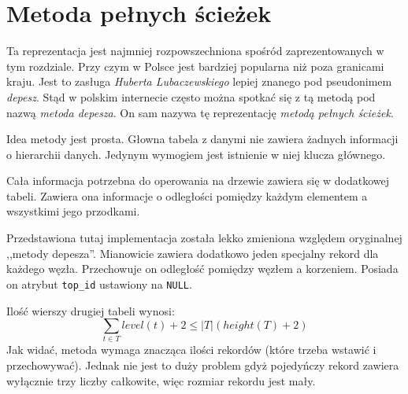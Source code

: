 \section{Metoda pełnych ścieżek}
% 




Ta reprezentacja jest najmniej rozpowszechniona spośród zaprezentowanych w tym rozdziale.
Przy czym w Polsce jest bardziej popularna niż poza granicami kraju.
Jest to zasługa \emph{Huberta Lubaczewskiego} lepiej znanego pod pseudonimem \emph{depesz}.
Stąd w polskim internecie często można spotkać się z tą metodą pod nazwą \emph{metoda depesza}.
On sam nazywa tę reprezentację \emph{metodą pełnych ścieżek}.




Idea metody jest prosta. 
Głowna tabela z danymi nie zawiera żadnych informacji o hierarchii danych. 
Jedynym wymogiem jest istnienie w niej klucza głównego.

Cała informacja potrzebna do operowania na drzewie zawiera się w dodatkowej tabeli. 
Zawiera ona informacje o odległości pomiędzy każdym elementem a wszystkimi jego przodkami.


Przedstawiona tutaj implementacja została lekko zmieniona względem oryginalnej ,,metody depesza''.
Mianowicie zawiera dodatkowo jeden specjalny rekord dla każdego węzła.
Przechowuje on odległość pomiędzy węzłem a korzeniem.
Posiada on atrybut \verb|top_id| ustawiony na \verb|NULL|.


Ilość wierszy drugiej tabeli wynosi:
\begin{displaymath}
    \sum_{t \in T} level(t) + 2 \leq |T|(height(T) + 2)
\end{displaymath}
Jak widać, metoda wymaga znacząca ilości rekordów (które trzeba wstawić i przechowywać).
Jednak nie jest to duży problem gdyż pojedyńczy rekord zawiera wyłącznie trzy liczby całkowite, więc rozmiar rekordu jest mały.

